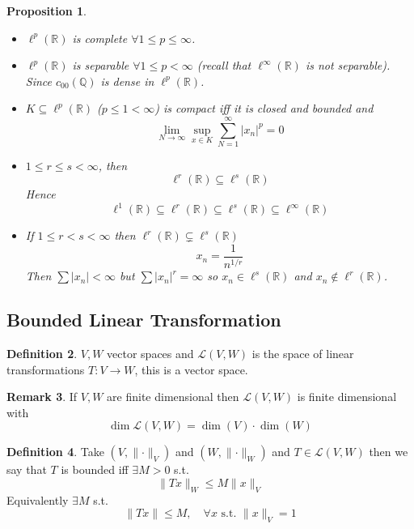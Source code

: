 \documentclass[11pt,a4paper]{article}
\theoremstyle{definition}
\newtheorem{definition}{Definition}[section]
\newtheorem{remark}[definition]{Remark}
\theoremstyle{plain}
\newtheorem{proposition}[definition]{Proposition}
\theoremstyle{remark}
\newcommand{\R}{\mathbb{R}}
\newcommand{\Q}{\mathbb{Q}}
\newcommand{\abs}[1]{\lvert #1 \rvert}
\newcommand{\norm}[1]{\lVert #1 \rVert}
\newcommand{\1}{\mathbbm{1}}
\begin{document}
\begin{proposition}
    \begin{itemize}
        \item $\ell^p(\R)$ is complete $\forall 1 \le p \le \infty$. 
        \item $\ell^p(\R)$ is separable $\forall 1 \le p < \infty$ (recall that $\ell^\infty(\R)$ is not separable). Since $c_{00}(\Q)$ is dense in $\ell^p(\R)$.
        \item $K \subseteq \ell^p(\R)$ ($p \le 1 < \infty$) is compact iff it is closed and bounded and 
        $$\lim_{N \to \infty} \sup_{x \in K} \sum_{N=1}^\infty \abs{x_n}^p = 0$$
        \item $1 \le r \le s < \infty$, then 
        $$\ell^r(\R) \subseteq \ell^s(\R)$$
        Hence 
        $$\ell^1(\R) \subseteq \ell^r (\R) \subseteq \ell^s(\R) \subseteq \ell^\infty (\R)$$
        \item If $1 \le r < s < \infty$ then $\ell^r (\R) \subsetneq \ell^s(\R)$ 
        $$x_n = \frac{1}{n^{1/r}}$$
        Then $\sum \abs{x_n} < \infty$ but $\sum \abs{x_n}^r = \infty$ so 
        $x_n \in \ell^s(\R)$ and $x_n \not\in \ell^r(\R)$. 
    \end{itemize}
\end{proposition}

\subsection{Bounded Linear Transformation}

\begin{definition}
    $V,W$ vector spaces and $\mathcal{L}(V,W)$ is the space of linear transformations $T \colon V \to W$, this is a vector space.
\end{definition}

\begin{remark}
    If $V,W$ are finite dimensional then $\mathcal{L}(V,W)$ is finite dimensional with 
    $$\operatorname{dim} \mathcal{L}(V,W) = \operatorname{dim}(V) \cdot \operatorname{dim} (W)$$
\end{remark}

\begin{definition}
    Take $(V, \norm{\cdot}_V)$ and $(W, \norm{\cdot}_W)$ and $T \in \mathcal{L}(V,W)$ then we say that $T$ is bounded iff $\exists M > 0$ s.t. 
    $$\norm{Tx}_W \le M \norm{x}_V$$
    Equivalently $\exists M$ s.t. 
    $$\norm{Tx} \le M, \quad \forall x \text{ s.t. } \norm{x}_V = 1$$
\end{definition}
\end{document}
